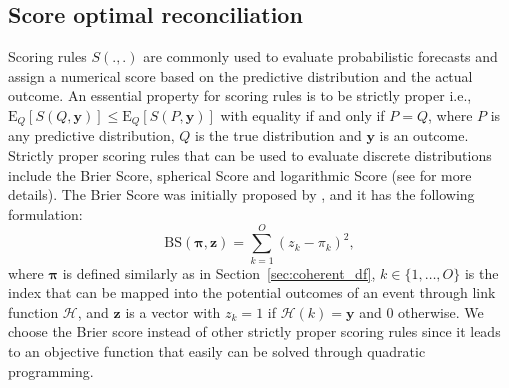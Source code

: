 \documentclass[a4paper,review,12pt,authoryear]{elsarticle}
\newcommand{\bpi}{\bm{\pi}}
\theoremstyle{definition}
\begin{document}
    \subsection{Score optimal reconciliation}
    \label{sec:algorithm}

    Scoring rules $S(.,.)$ are commonly used to evaluate probabilistic forecasts and assign a numerical score based on the predictive distribution and the actual outcome.
    An essential property for scoring rules is to be strictly proper i.e., $\text{E}_Q[S(Q, \mathbf{y})] \leq \text{E}_Q[S(P, \mathbf{y})]$ with equality if and only if $P=Q$, where $P$ is any predictive distribution, $Q$ is the true distribution and $\mathbf{y}$ is an outcome.
    Strictly proper scoring rules that can be used to evaluate discrete distributions include the Brier Score, spherical Score and logarithmic Score (see \citealp{gneitingStrictlyProperScoring2007} for more details).
    The Brier Score was initially proposed by \cite{brier1950verification}, and it has the following formulation:
    \[
      \text{BS}(\bpi, \mathbf{z}) = \sum_{k=1}^{O}(z_k - \pi_k)^2,
    \] where $\bpi$ is defined similarly as in Section~\ref{sec:coherent_df},
    $k\in \{1,\dots,O\}$ is the index that can be mapped into the potential outcomes of an event through link function $\mathcal{H}$, and $\mathbf{z}$ is a vector with $z_k = 1$ if $\mathcal{H}(k) = \mathbf{y}$ and $0$ otherwise.
    We choose the Brier score instead of other strictly proper scoring rules since it leads to an objective function that easily can be solved through quadratic programming.
\end{document}
